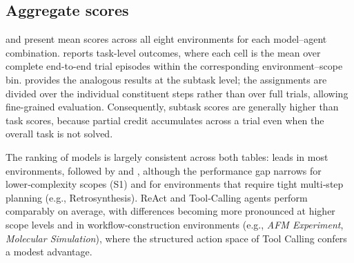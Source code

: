 \subsection{Aggregate scores} \label{app:aggregate-scores}

 and  present mean scores across all eight environments for each model–agent combination.  reports task-level outcomes, where each cell is the mean over complete end-to-end trial episodes within the corresponding environment–scope bin.  provides the analogous results at the subtask level; the assignments are divided over the individual constituent steps rather than over full trials, allowing fine-grained evaluation. Consequently, subtask scores are generally higher than task scores, because partial credit accumulates across a trial even when the overall task is not solved.

The ranking of models is largely consistent across both tables: \claudesonnet leads in most environments, followed by \gptfourO and \gptoss, although the performance gap narrows for lower‑complexity scopes (S1) and for environments that require tight multi‑step planning (e.g., Retrosynthesis). ReAct and Tool‑Calling agents perform comparably on average, with differences becoming more pronounced at higher scope levels and in workflow‑construction environments (e.g., \textit{AFM Experiment}, \textit{Molecular Simulation}), where the structured action space of Tool Calling confers a modest advantage.

\begin{table}[H]
    \centering
    \caption{\textbf{Average scores by environment and scope for each model and agent type.} R=ReAct, TC=Tool Calling. Environments are grouped by task category: \textit{Hypothesis-driven inquiry} (Spectra Elucidation, Circuit Inference), \textit{Strategic reasoning} (Retrosynthesis), and \textit{Workflow construction} (AFM Experiment, Molecular Simulation, Adsorption Surface, ML Property). Scope levels (S1–S4) reflect increasing task difficulty within each environment.}
    \label{tab:aggregate-scores}
    
\end{table}

\begin{table}[H]
    \centering
    \caption{\textbf{Subtask-level average scores by environment and scope for each model and agent type.} R=ReAct, TC=Tool Calling. Each cell reports the mean over the individual subtask items belonging to that environment–scope combination, providing a finer-grained view of model capabilities.}
    \label{tab:aggregate-scores-subtask}
    
\end{table}


